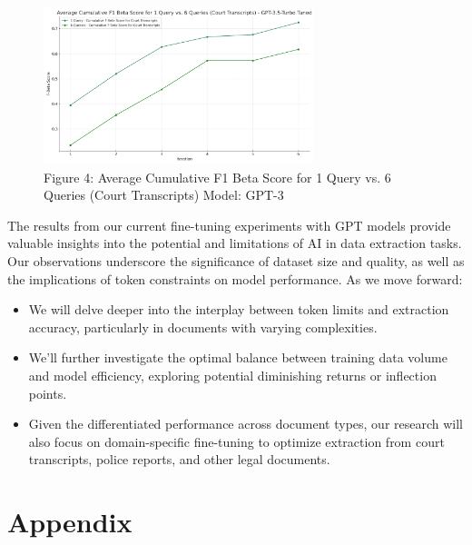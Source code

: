 \documentclass{article}
\begin{document}
\begin{figure}[h]
    \centering
    \includegraphics[width=0.7\textwidth]{data/court_transcripts_graph_tuned.png}
    \caption{Figure 4: Average Cumulative F1 Beta Score for 1 Query vs. 6 Queries (Court Transcripts) Model: GPT-3}
\end{figure}

The results from our current fine-tuning experiments with GPT models provide valuable insights into the potential and limitations of AI in data extraction tasks. Our observations underscore the significance of dataset size and quality, as well as the implications of token constraints on model performance. As we move forward:

\begin{itemize}
    \item We will delve deeper into the interplay between token limits and extraction accuracy, particularly in documents with varying complexities.
    \item We'll further investigate the optimal balance between training data volume and model efficiency, exploring potential diminishing returns or inflection points.
    \item Given the differentiated performance across document types, our research will also focus on domain-specific fine-tuning to optimize extraction from court transcripts, police reports, and other legal documents.
\end{itemize}

\section{Appendix}
\end{document}
